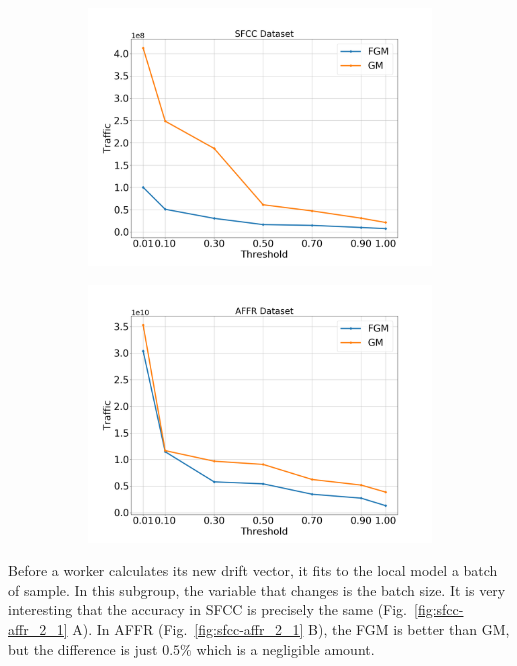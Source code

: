 \begin{figure}[H]
\begin{subfigure}[b]{0.45\textwidth}
        \includegraphics[width=\textwidth]{./images/results/sfc-plots/exp_Fig_1_3.png}
        \caption{}
    \end{subfigure}
    \hfill
    \begin{subfigure}[b]{0.45\textwidth}
        \centering
        \includegraphics[width=\textwidth]{./images/results/amazon-plots/exp_Fig_1_3.png}
        \caption{}
    \end{subfigure}
    \caption{}
    \label{fig:sfcc-affr_1}
\end{figure}

\newpage

Before a worker calculates its new drift vector, it fits to the local model a batch of sample.
In this subgroup, the variable that changes is the batch size.
It is very interesting that the accuracy in SFCC is precisely the same (Fig.~\ref{fig:sfcc-affr_2_1} A).
In AFFR (Fig.~\ref{fig:sfcc-affr_2_1} B), the FGM is better than GM, but the difference is just $0.5\%$ which is a negligible amount.

